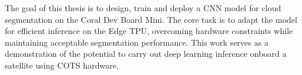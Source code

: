 {The goal of this thesis is to design, train and deploy a CNN model for cloud segmentation on the Coral Dev Board Mini. The core task is to adapt the model for efficient inference on the Edge TPU, overcoming hardware constraints while maintaining acceptable segmentation performance. This work serves as a demonstration of the potential to carry out deep learning inference onboard a satellite using COTS hardware.


}